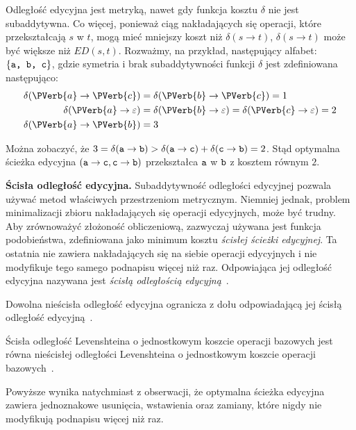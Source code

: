 \documentclass{praca1}
\begin{document}
Odległość edycyjna jest metryką, nawet gdy funkcja kosztu $\delta$ nie jest subaddytywna. Co więcej, ponieważ ciąg nakładających się operacji, które przekształcają $s$ w $t$, mogą mieć mniejszy koszt niż $\delta(s \rightarrow t)$, $\delta(s \rightarrow t)$ może być większe niż $ED(s,t)$. Rozważmy, na przykład, następujący alfabet: $\{\verb|a, b, c|\}$, gdzie symetria i brak subaddytywności funkcji $\delta$ jest zdefiniowana następująco:
\begin{align*}
\delta(\PVerb{a} \rightarrow \PVerb{c}) &= \delta(\PVerb{b} \rightarrow \PVerb{c}) = 1 \\
\delta(\PVerb{a} \rightarrow \varepsilon) &= \delta(\PVerb{b} \rightarrow \varepsilon) = \delta(\PVerb{c} \rightarrow \varepsilon) = 2 \\
\delta(\PVerb{a} \rightarrow \PVerb{b}) &= 3
\end{align*}

Można zobaczyć, że $3 = \delta(\verb|a| \rightarrow \verb|b|) > \delta(\verb|a| \rightarrow \verb|c|) + \delta(\verb|c| \rightarrow \verb|b|) = 2$. Stąd optymalna ścieżka edycyjna $(\verb|a| \rightarrow \verb|c|, \verb|c| \rightarrow \verb|b|)$ przekształca $\verb|a|$ w $\verb|b|$ z kosztem równym $2$.

\textbf{Ścisła odległość edycyjna.} Subaddytywność odległości edycyjnej pozwala używać metod właściwych przestrzeniom metrycznym. Niemniej jednak, problem minimalizacji zbioru nakładających się operacji edycyjnych, może być trudny. Aby zrównoważyć złożoność obliczeniową, zazwyczaj używana jest funkcja podobieństwa, zdefiniowana jako minimum kosztu \emph{ścisłej ścieżki edycyjnej}. Ta ostatnia nie zawiera nakładających się na siebie operacji edycyjnych i nie modyfikuje tego samego podnapisu więcej niż raz. Odpowiająca jej odległość edycyjna nazywana jest \emph{ścisłą odległością edycyjną}~\cite{Boytsov2011:indexingmethods}.

\begin{lemma}
Dowolna nieścisła odległość edycyjna ogranicza z dołu odpowiadającą jej ścisłą odległość edycyjną~\cite{Boytsov2011:indexingmethods}.
\end{lemma}

\begin{lemma}
\label{lem:001}
Ścisła odległość Levenshteina o jednostkowym koszcie operacji bazowych jest równa nieścisłej odległości Levenshteina o jednostkowym koszcie operacji bazowych~\cite{Boytsov2011:indexingmethods}.
\end{lemma}

Powyższe wynika natychmiast z obserwacji, że optymalna ścieżka edycyjna zawiera jednoznakowe usunięcia, wstawienia oraz zamiany, które nigdy nie modyfikują podnapisu więcej niż raz.
\end{document}
